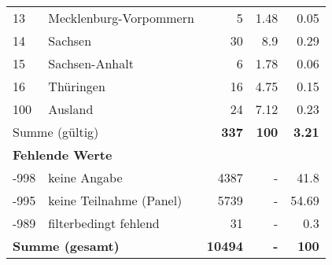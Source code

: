 \begin{longtable}{lXrrr}
     13 &
     \multicolumn{1}{X}{ Mecklenburg-Vorpommern   } &


       \num{5} &
       \num[round-mode=places,round-precision=2]{1,48} &
         \num[round-mode=places,round-precision=2]{0,05} \\

     14 &
     \multicolumn{1}{X}{ Sachsen   } &


       \num{30} &
       \num[round-mode=places,round-precision=2]{8,9} &
         \num[round-mode=places,round-precision=2]{0,29} \\

     15 &
     \multicolumn{1}{X}{ Sachsen-Anhalt   } &


       \num{6} &
       \num[round-mode=places,round-precision=2]{1,78} &
         \num[round-mode=places,round-precision=2]{0,06} \\

     16 &
     \multicolumn{1}{X}{ Thüringen   } &


       \num{16} &
       \num[round-mode=places,round-precision=2]{4,75} &
         \num[round-mode=places,round-precision=2]{0,15} \\

     100 &
     \multicolumn{1}{X}{ Ausland   } &


       \num{24} &
       \num[round-mode=places,round-precision=2]{7,12} &
         \num[round-mode=places,round-precision=2]{0,23} \\
     \midrule
     \multicolumn{2}{l}{Summe (gültig)} &
       \textbf{\num{337}} &
     \textbf{100} &
       \textbf{\num[round-mode=places,round-precision=2]{3,21}} \\
     \multicolumn{5}{l}{\textbf{Fehlende Werte}}\\
       -998 &
       keine Angabe &
         \num{4387} &
        - &
         \num[round-mode=places,round-precision=2]{41,8} \\
       -995 &
       keine Teilnahme (Panel) &
         \num{5739} &
        - &
         \num[round-mode=places,round-precision=2]{54,69} \\
       -989 &
       filterbedingt fehlend &
         \num{31} &
        - &
         \num[round-mode=places,round-precision=2]{0,3} \\
     \midrule
     \multicolumn{2}{l}{\textbf{Summe (gesamt)}} &
          \textbf{\num{10494}} &
        \textbf{-} &
        \textbf{100} \\
     \bottomrule
     \end{longtable}
     
